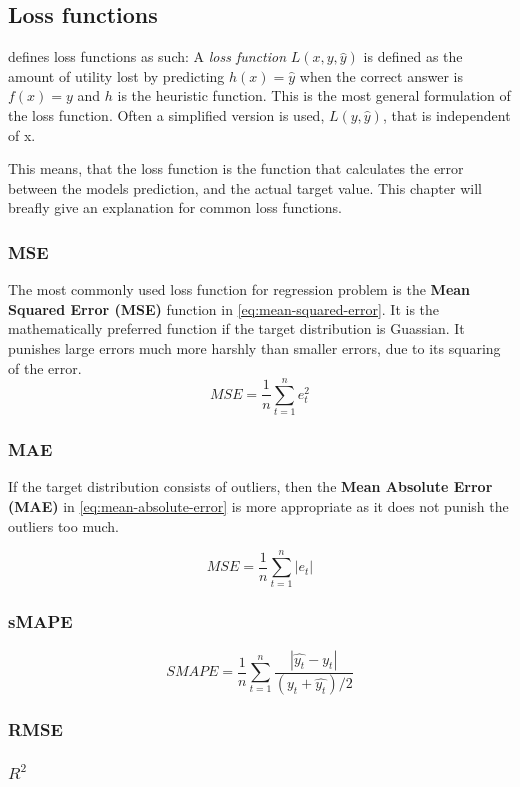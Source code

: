 \subsection{Loss functions}
\label{section:BT:Loss}
\cite[p. 710-711]{Russel2012} defines loss functions as such:
A \textit{loss function} $L(x, y, \hat{y})$ is defined as the amount of utility lost by predicting 
$h(x)=\hat{y}$ when the correct answer is $f(x) = y$ and $h$ is the heuristic function.
This is the most general formulation of the loss function. Often a simplified version is used,
$L(y, \hat{y})$, that is independent of x.

This means, that the loss function is the function that calculates the error between the 
models prediction, and the actual target value.
This chapter will breafly give an explanation for common loss functions.


\subsubsection{MSE}
The most commonly used loss function for regression problem is the 
\textbf{Mean Squared Error (MSE)} function in \autoref{eq:mean-squared-error}.
It is the mathematically preferred function if the target distribution is Guassian.
It punishes large errors much more harshly than smaller errors, due to its squaring of the error.
\begin{equation}
  \label{eq:mean-squared-error}
  MSE = \frac{1}{n} \sum_{t=1}^n e_t^2
\end{equation}

\subsubsection{MAE}
If the target distribution consists of outliers, then the 
\textbf{Mean Absolute Error (MAE)} in \autoref{eq:mean-absolute-error} is more appropriate
as it does not punish the outliers too much.

\begin{equation}
  \label{eq:mean-absolute-error}
  MSE = \frac{1}{n} \sum_{t=1}^n |e_t|
\end{equation}

\subsubsection{sMAPE}
\begin{equation}
  \label{eq:sMape}
  SMAPE = \frac{1}{n} \sum_{t=1}^n \frac{|\hat{y_t} - y_t|}{(y_t + \hat{y_t}) / 2}
\end{equation}

\subsubsection{RMSE}
\subsubsection{$R^2$}


